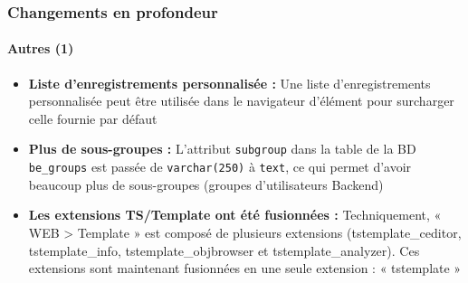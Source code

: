 \begin{frame}[fragile]
	\frametitle{Changements en profondeur}
	\framesubtitle{Autres (1)}

	\begin{itemize}

		\item \textbf{Liste d'enregistrements personnalisée :}\newline
			\small
				Une liste d'enregistrements personnalisée peut être utilisée dans le navigateur d'élément pour surcharger celle fournie par défaut
			\normalsize

		\item \textbf{Plus de sous-groupes :}\newline
			\small
				L'attribut \texttt{subgroup} dans la table de la BD \texttt{be\_groups} est passée de \texttt{varchar(250)} à \texttt{text}, ce qui permet d'avoir beaucoup plus de sous-groupes (groupes d'utilisateurs Backend)
			\normalsize

		\item \textbf{Les extensions TS/Template ont été fusionnées :}\newline
			\small
				Techniquement, « WEB > Template » est composé de plusieurs extensions (tstemplate\_ceditor, tstemplate\_info,
tstemplate\_objbrowser et tstemplate\_analyzer). Ces extensions sont maintenant fusionnées en une seule extension : « tstemplate »
			\normalsize

	\end{itemize}
	
\end{frame}


